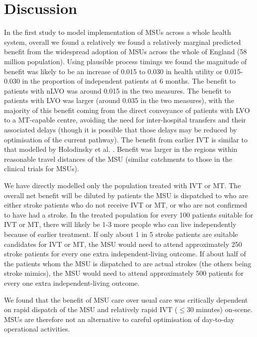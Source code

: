 \section{Discussion}


In the first study to model implementation of MSUs across a whole health system, overall we found a relatively we found a relatively marginal predicted benefit from the widespread adoption of MSUs across the whole of England (58 million population). Using plausible process timings we found the magnitude of benefit was likely to be an increase of 0.015 to 0.030 in health utility or 0.015-0.030 in the proportion of independent patients at 6 months. The benefit to patients with nLVO was around 0.015 in the two measures. The benefit to patients with LVO was larger (around 0.035 in the two measures), with the majority of this benefit coming from the direct conveyance of patients with LVO to a MT-capable centre, avoiding the need for inter-hospital transfers and their associated delays (though it is possible that those delays may be reduced by optimisation of the current pathway). The benefit from earlier IVT is similar to that modelled by Holodinsky et al. \cite{holodinsky_jessalyn_k_what_2020}. Benefit was larger in the regions within reasonable travel distances of the MSU (similar catchments to those in the clinical trials for MSUs).

We have directly modelled only the population treated with IVT or MT. The overall net benefit will be diluted by patients the MSU is dispatched to who are either stroke patients who do not receive IVT or MT, or who are not confirmed to have had a stroke. In the treated population for every 100 patients suitable for IVT or MT, there will likely be 1-3 more people who can live independently because of earlier treatment. If only about 1 in 5 stroke patients are suitable candidates for IVT or MT, the MSU would need to attend approximately 250 stroke patients for every one extra independent-living outcome. If about half of the patients whom the MSU is dispatched to are actual strokes (the others being stroke mimics), the MSU would need to attend approximately 500 patients for every one extra independent-living outcome. 

We found that the benefit of MSU care over usual care was critically dependent on rapid dispatch of the MSU and relatively rapid IVT ($\leq$30 minutes) on-scene. MSUs are therefore not an alternative to careful optimisation of day-to-day operational activities.


